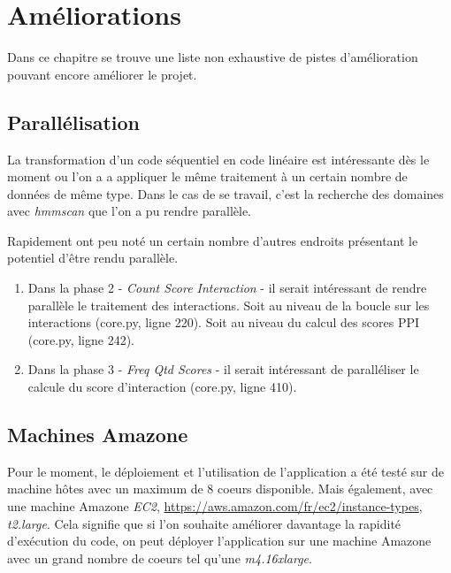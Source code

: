 \chapter{Améliorations}
\label{ch:improve}

Dans ce chapitre se trouve une liste non exhaustive de pistes d'amélioration pouvant encore améliorer le projet. 

\section{Parallélisation}

La transformation d'un code séquentiel en code linéaire est intéressante dès le moment ou l'on a a appliquer le même traitement à un certain nombre de données de même type. Dans le cas de se travail, c'est la recherche des domaines avec \emph{hmmscan} que l'on a pu rendre parallèle.

Rapidement ont peu noté un certain nombre d'autres endroits présentant le potentiel d'être rendu parallèle.

\begin{enumerate} \item Dans la phase 2 - \emph{Count Score Interaction} - il serait intéressant de rendre parallèle le traitement des interactions. Soit au niveau de la boucle sur les interactions (core.py, ligne 220). Soit au niveau du calcul des scores PPI (core.py, ligne 242).
\item Dans la phase 3 - \emph{Freq Qtd Scores} - il serait intéressant de paralléliser le calcule du score d'interaction (core.py, ligne 410).
\end{enumerate}

\section{Machines Amazone}

Pour le moment, le déploiement et l'utilisation de l'application a été testé sur de machine hôtes avec un maximum de 8 coeurs disponible. Mais également, avec une machine Amazone \emph{EC2}, \url{https://aws.amazon.com/fr/ec2/instance-types}, \emph{t2.large}. Cela signifie que si l'on souhaite améliorer davantage la rapidité d'exécution du code, on peut déployer l'application sur une machine Amazone avec un grand nombre de coeurs tel qu'une \emph{m4.16xlarge}.
